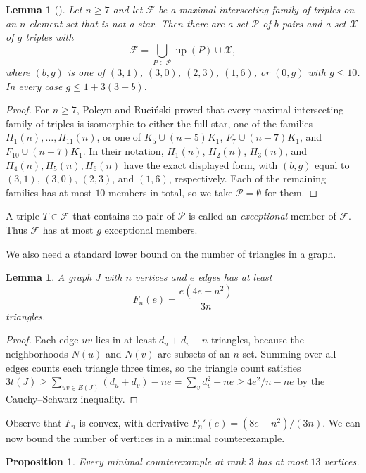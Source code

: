 \documentclass[11pt]{amsart}
\newtheorem{lemma}[theorem]{Lemma}
\newtheorem{proposition}[theorem]{Proposition}
\theoremstyle{definition}
\theoremstyle{remark}
\numberwithin{equation}{section}
\newcommand{\up}{\operatorname{up}}
\begin{document}
\begin{lemma}[{\cite[Theorem~4 and Section~2.4]{PR}}]\label{lem:PR}
Let $n\ge7$ and let $\mathcal F$ be a maximal intersecting family of triples
on an $n$-element set that is not a star. Then there are a set $\mathcal P$
of $b$ pairs and a set $\mathcal X$ of $g$ triples with
\[
\mathcal F=\bigcup_{P\in\mathcal P}\up(P)\cup\mathcal X,
\]
where $(b,g)$ is one of $(3,1)$, $(3,0)$, $(2,3)$, $(1,6)$, or $(0,g)$ with
$g\le10$. In every case $g\le1+3(3-b)$.
\end{lemma}

\begin{proof}
For $n\ge7$, Polcyn and Ruci\'nski proved that every maximal intersecting
family of triples is isomorphic to either the full star, one of the families
$H_1(n),\dots,H_{11}(n)$, or one of $K_5\cup(n-5)K_1$, $F_7\cup(n-7)K_1$, and
$F_{10}\cup(n-7)K_1$. In their notation, $H_1(n)$, $H_2(n)$, $H_3(n)$, and
$H_4(n),H_5(n),H_6(n)$ have the exact displayed form, with $(b,g)$ equal to
$(3,1)$, $(3,0)$, $(2,3)$, and $(1,6)$, respectively. Each of the remaining
families has at most $10$ members in total, so we take $\mathcal P=\emptyset$
for them.
\end{proof}

A triple $T\in\mathcal F$ that contains no pair of $\mathcal P$ is called an
\emph{exceptional} member of $\mathcal F$. Thus $\mathcal F$ has at most $g$
exceptional members.

We also need a standard lower bound on the number of triangles in a graph.

\begin{lemma}\label{lem:triangles}
A graph $J$ with $n$ vertices and $e$ edges has at least
\[
F_n(e)=\frac{e(4e-n^2)}{3n}
\]
triangles.
\end{lemma}

\begin{proof}
Each edge $uv$ lies in at least $d_u+d_v-n$ triangles, because the
neighborhoods $N(u)$ and $N(v)$ are subsets of an $n$-set. Summing over all
edges counts each triangle three times, so the triangle count satisfies
$3t(J)\ge\sum_{uv\in E(J)}(d_u+d_v)-ne=\sum_v d_v^2-ne\ge4e^2/n-ne$ by the
Cauchy--Schwarz inequality.
\end{proof}

Observe that $F_n$ is convex, with derivative $F_n'(e)=(8e-n^2)/(3n)$. We can
now bound the number of vertices in a minimal counterexample.

\begin{proposition}\label{prop:large}
Every minimal counterexample at rank $3$ has at most $13$ vertices.
\end{proposition}
\end{document}
